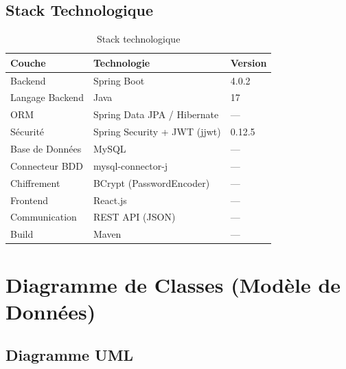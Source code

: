 \documentclass[12pt,a4paper]{report}
\begin{document}
\section{Stack Technologique}

\begin{table}[H]
\centering
\begin{tabular}{|l|l|l|}
\hline
\textbf{Couche} & \textbf{Technologie} & \textbf{Version} \\ \hline
Backend & Spring Boot & 4.0.2 \\ \hline
Langage Backend & Java & 17 \\ \hline
ORM & Spring Data JPA / Hibernate & --- \\ \hline
Sécurité & Spring Security + JWT (jjwt) & 0.12.5 \\ \hline
Base de Données & MySQL & --- \\ \hline
Connecteur BDD & mysql-connector-j & --- \\ \hline
Chiffrement & BCrypt (PasswordEncoder) & --- \\ \hline
Frontend & React.js & --- \\ \hline
Communication & REST API (JSON) & --- \\ \hline
Build & Maven & --- \\ \hline
\end{tabular}
\caption{Stack technologique}
\end{table}

\chapter{Diagramme de Classes (Modèle de Données)}

\section{Diagramme UML}
\end{document}
